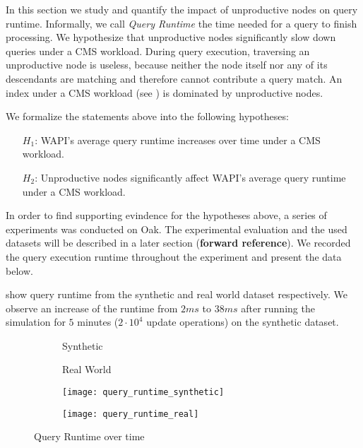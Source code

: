 \documentclass[abstracton,12pt]{scrartcl}
\theoremstyle{definition}
\begin{document}
In this section we study and quantify the impact of unproductive nodes on
query runtime. Informally, we call \textit{Query Runtime} the time
needed for a query to finish processing. We hypothesize that unproductive nodes
significantly slow down queries under a CMS workload. During query
execution, traversing an unproductive node is
useless, because neither the node itself nor any of its descendants are matching
and therefore cannot contribute a query match.
An index under a CMS workload (see ) is dominated
by unproductive nodes.

We formalize the statements above into the following hypotheses:

\begin{shaded}
  \begin{itemize}
  \item[$H_1$:] WAPI's average query runtime increases over time under a CMS workload.
  \item[$H_2$:] Unproductive nodes significantly affect WAPI's average
    query runtime under a CMS workload. 
  \end{itemize}
\end{shaded}

In order to find supporting evindence for the hypotheses above, a series of
experiments was conducted on Oak. The experimental evaluation and the used
datasets will be described in a later section (\textbf{forward reference}). We
recorded  the query execution runtime throughout the experiment and present the data below.

 show 
query runtime from the synthetic and real world dataset respectively. 
We observe an increase of the runtime from $2 ms$ to $38 ms$
after running the simulation for $5$ minutes ($2 \cdot 10^4$ update operations)
on the synthetic dataset.

\begin{figure}[h]
  \centering
  \begin{subfigure}{0.49\linewidth}
    \centering
    Synthetic
  \end{subfigure}
  \begin{subfigure}{0.49\linewidth}
    \centering
    Real World
  \end{subfigure}
  \begin{subfigure}{0.49\linewidth}
    \centering
    \texttt{[image: query\_runtime\_synthetic]}
    \caption{}
    \label{fig:query_runtime_synthetic}
  \end{subfigure}
  \begin{subfigure}{0.49\linewidth}
    \centering
    \texttt{[image: query\_runtime\_real]}
    \caption{}
    \label{fig:query_runtime_real}
  \end{subfigure}
  \caption{Query Runtime over time}
  \label{fig:query_runtime}
\end{figure}
\end{document}
